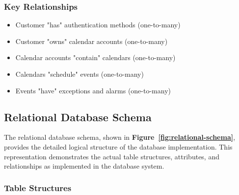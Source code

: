 \documentclass[12pt,a4paper,twoside]{report}
\begin{document}
\subsubsection{Key Relationships}

\begin{itemize}
    \item Customer "has" authentication methods (one-to-many)
    \item Customer "owns" calendar accounts (one-to-many)
    \item Calendar accounts "contain" calendars (one-to-many)
    \item Calendars "schedule" events (one-to-many)
    \item Events "have" exceptions and alarms (one-to-many)
\end{itemize}

\subsection{Relational Database Schema}

The relational database schema, shown in \textbf{Figure~\ref{fig:relational-schema}}, provides the detailed logical structure of the database implementation. This representation demonstrates the actual table structures, attributes, and relationships as implemented in the database system.

\subsubsection{Table Structures}
\end{document}
